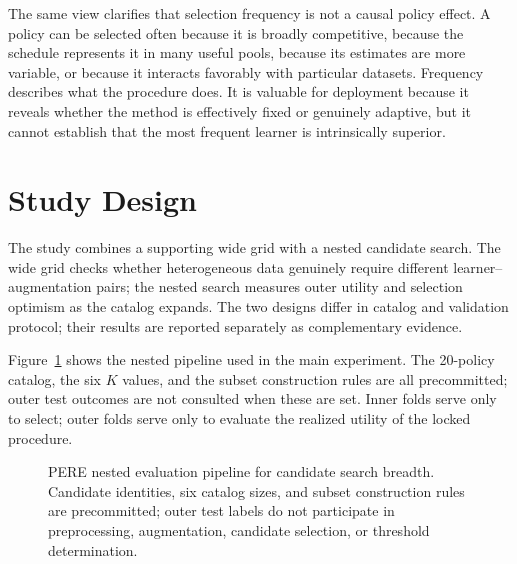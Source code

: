 \documentclass[referee]{USG}
\newcommand{\optm}{\ensuremath{\mathrm{optimism}}}
\newcommand{\uouter}{\ensuremath{U_{\mathrm{out}}}}
\begin{document}
The same view clarifies that selection frequency is not a causal policy effect. A policy can be selected often because it is broadly competitive, because the schedule represents it in many useful pools, because its estimates are more variable, or because it interacts favorably with particular datasets. Frequency describes what the procedure does. It is valuable for deployment because it reveals whether the method is effectively fixed or genuinely adaptive, but it cannot establish that the most frequent learner is intrinsically superior.

\section{Study Design}
The study combines a supporting wide grid with a nested candidate search. The wide grid checks whether heterogeneous data genuinely require different learner--augmentation pairs; the nested search measures outer utility and selection optimism as the catalog expands. The two designs differ in catalog and validation protocol; their results are reported separately as complementary evidence.

Figure~\ref{fig:design} shows the nested pipeline used in the main experiment. The 20-policy catalog, the six $K$ values, and the subset construction rules are all precommitted; outer test outcomes are not consulted when these are set. Inner folds serve only to select; outer folds serve only to evaluate the realized utility of the locked procedure.

\begin{figure}[t]
\centering
{}
\caption{PERE nested evaluation pipeline for candidate search breadth. Candidate identities, six catalog sizes, and subset construction rules are precommitted; outer test labels do not participate in preprocessing, augmentation, candidate selection, or threshold determination.}
\label{fig:design}
\end{figure}
\end{document}
